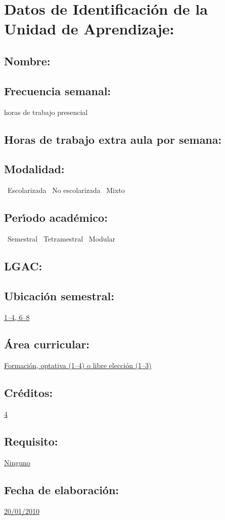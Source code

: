 \documentclass[10 pt]{article}
\begin{document}


\section{Datos de Identificaci\'{o}n de la Unidad de Aprendizaje:}
\subsection{Nombre:} 
\subsection{Frecuencia semanal:} horas de trabajo presencial 
\subsection{Horas de trabajo extra aula por semana:} 
\subsection{Modalidad:} \yes~Escolarizada \no~No escolarizada \no~Mixto
\subsection{Per\'{\i}odo acad\'{e}mico:} \yes~Semestral
\no~Tetramestral \no~Modular
\subsection{LGAC:} \underline{\mado}
\subsection{Ubicaci\'{o}n semestral:} \underline{1--4, 6--8}
\subsection{\'{A}rea curricular:} \underline{Formaci\'{o}n, optativa (1--4) o libre
  elecci\'{o}n (1--3)}
\subsection{Cr\'{e}ditos:} \underline{4}
\subsection{Requisito:} \underline{Ninguno}
\subsection{Fecha de elaboraci\'{o}n:} \underline{20/01/2010}
\end{document}
